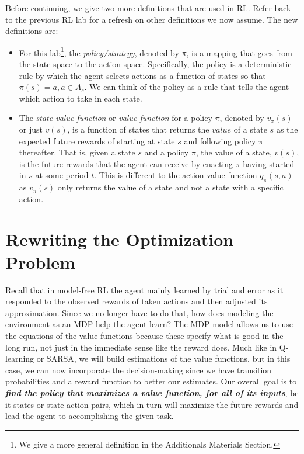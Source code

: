 Before continuing, we give two more definitions that are used in RL. Refer back to the previous RL lab for a refresh on other definitions we now assume.
The new definitions are:
\begin{itemize}
    \item For this lab\footnote{We give a more general definition in the Additionals Materials Section.}, the \emph{policy/strategy}, denoted by $\pi$, is a mapping that goes from the state space to the action space.
    Specifically, the policy is a deterministic rule by which the agent selects actions as a function of states so that $\pi(s)=a, a\in A_s$.
    We can think of the policy as a rule that tells the agent which action to take in each state.

    \item The \emph{state-value function} or \emph{value function} for a policy $\pi$, denoted by $v_\pi(s)$ or just $v(s)$, is a function of states that returns the $value$ of a state $s$ as the expected future rewards of starting at state $s$ and following policy $\pi$ thereafter.
    That is, given a state $s$ and a policy $\pi$, the value of a state, $v(s)$, is the future rewards that the agent can receive by enacting $\pi$ having started in $s$ at some period $t$.
    This is different to the action-value function $q_\pi(s,a)$ as $v_\pi(s)$ only returns the value of a state and not a state with a specific action.
\end{itemize}

\section*{Rewriting the Optimization Problem}
Recall that in model-free RL the agent mainly learned by trial and error as it responded to the observed rewards of taken actions and then adjusted its approximation.
Since we no longer have to do that, how does modeling the environment as an MDP help the agent learn?
The MDP model allows us to use the equations of the value functions because these specify what is good in the long run, not just in the immediate sense like the reward does.
Much like in Q-learning or SARSA, we will build estimations of the value functions, but in this case, we can now incorporate the decision-making since we have transition probabilities and a reward function to better our estimates.
Our overall goal is to \textbf{\textit{find the policy that maximizes a value function, for all of its inputs}}, be it states or state-action pairs, which in turn will maximize the future rewards and lead the agent to accomplishing the given task.

